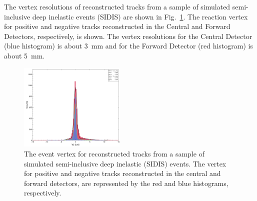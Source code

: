 The vertex resolutions of reconstructed tracks from a sample of simulated semi-inclusive deep inelastic events
(SIDIS) are shown in Fig.~\ref{fig:vtxres}. The reaction vertex for positive and negative tracks reconstructed in
the Central and Forward Detectors, respectively, is shown. The vertex resolutions for the Central Detector (blue
histogram) is about 3~mm and for the Forward Detector (red histogram) is about 5~mm.

\begin{figure}[ht]
\includegraphics[width=0.45\textwidth]{pics/VertexResolution.png}
\caption{The event vertex for reconstructed tracks from a sample of simulated semi-inclusive deep inelastic
  (SIDIS) events. The vertex for positive and negative tracks reconstructed  in the central and forward detectors,
  are represented by the red and blue histograms, respectively.}
\label{fig:vtxres}
\end{figure}
